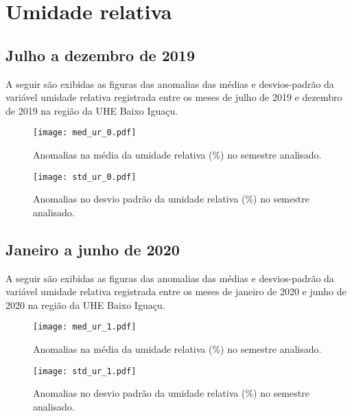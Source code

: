\documentclass[a4paper,12pt]{article}
\begin{document}
        \newpage

        \section{Umidade relativa }
        \subsection{Julho a dezembro de 2019}
        \hspace{0.5cm} A seguir são exibidas as figuras das anomalias das médias e desvios-padrão da variável umidade relativa
        registrada entre os meses de julho de 2019 e dezembro de 2019 na região da UHE Baixo Iguaçu.

        \begin{figure}[!htb]
        \centering
        \texttt{[image: med\_ur\_0.pdf]}
        \caption{Anomalias na média da umidade relativa (\%) no semestre analisado.}
        \label{fig:figmed_ur_0}
        \end{figure}

        \begin{figure}[!htb]
        \centering
        \texttt{[image: std\_ur\_0.pdf]}
        \caption{Anomalias no desvio padrão da umidade relativa (\%) no semestre analisado.}
        \label{fig:figstd_ur_0}
        \end{figure}

        \newpage
        \subsection{Janeiro a junho de 2020}
        \hspace{0.5cm} A seguir são exibidas as figuras das anomalias das médias e desvios-padrão da variável umidade relativa
        registrada entre os meses de janeiro de 2020 e junho de 2020 na região da UHE Baixo Iguaçu.

        \begin{figure}[!htb]
        \centering
        \texttt{[image: med\_ur\_1.pdf]}
        \caption{Anomalias na média da umidade relativa (\%) no semestre analisado.}
        \label{fig:figmed_ur_1}
        \end{figure}

        \begin{figure}[!htb]
        \centering
        \texttt{[image: std\_ur\_1.pdf]}
        \caption{Anomalias no desvio padrão da umidade relativa (\%) no semestre analisado.}
        \label{fig:figstd_ur_1}
        \end{figure}
\end{document}
